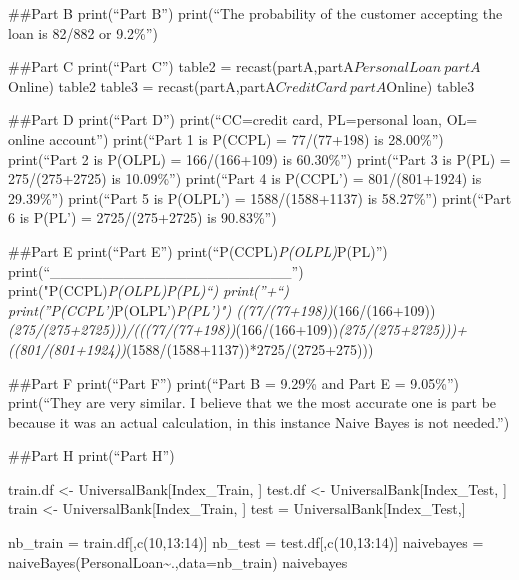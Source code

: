 \documentclass[
]{article}
\begin{document}
\#\#Part B print(``Part B'') print(``The probability of the customer
accepting the loan is 82/882 or 9.2\%'')

\#\#Part C print(``Part C'') table2 =
recast(partA,partA\(PersonalLoan~partA\)Online) table2 table3 =
recast(partA,partA\(CreditCard~partA\)Online) table3

\#\#Part D print(``Part D'') print(``CC=credit card, PL=personal loan,
OL= online account'') print(``Part 1 is P(CC\textbar PL) = 77/(77+198)
is 28.00\%'') print(``Part 2 is P(OL\textbar PL) = 166/(166+109) is
60.30\%'') print(``Part 3 is P(PL) = 275/(275+2725) is 10.09\%'')
print(``Part 4 is P(CC\textbar PL') = 801/(801+1924) is 29.39\%'')
print(``Part 5 is P(OL\textbar PL') = 1588/(1588+1137) is 58.27\%'')
print(``Part 6 is P(PL') = 2725/(275+2725) is 90.83\%'')

\#\#Part E print(``Part E'')
print(``P(CC\textbar PL)\emph{P(OL\textbar PL)}P(PL)'')
print(``\_\_\_\_\_\_\_\_\_\_\_\_\_\_\_\_\_\_\_\_\_\_\_'')
print("P(CC\textbar PL)\emph{P(OL\textbar PL)P(PL)``) print(''+``)
print(''P(CC\textbar PL')}P(OL\textbar PL')\emph{P(PL')")
((77/(77+198))}(166/(166+109))\emph{(275/(275+2725)))/(((77/(77+198))}(166/(166+109))\emph{(275/(275+2725)))+((801/(801+1924))}(1588/(1588+1137))*2725/(2725+275)))

\#\#Part F print(``Part F'') print(``Part B = 9.29\% and Part E =
9.05\%'') print(``They are very similar. I believe that we the most
accurate one is part be because it was an actual calculation, in this
instance Naive Bayes is not needed.'')

\#\#Part H print(``Part H'')

train.df \textless- UniversalBank{[}Index\_Train, {]} test.df \textless-
UniversalBank{[}Index\_Test, {]} train \textless-
UniversalBank{[}Index\_Train, {]} test = UniversalBank{[}Index\_Test,{]}

nb\_train = train.df{[},c(10,13:14){]} nb\_test =
test.df{[},c(10,13:14){]} naivebayes =
naiveBayes(PersonalLoan\textasciitilde.,data=nb\_train) naivebayes
\end{document}
